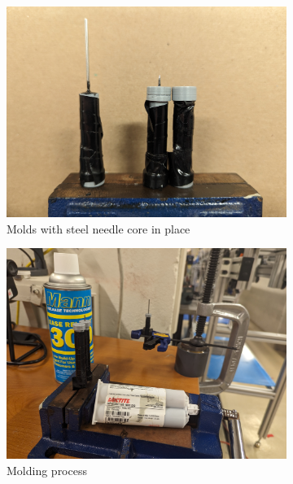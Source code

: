 \begin{figure}[!ht]
    \centering
    \begin{subfigure}[t]{0.30\textwidth}
        \centering
        \includegraphics[width=\textwidth]{assets/3 design/Molds.jpg}
        \caption{Molds with steel needle core in place}
    \end{subfigure}
    \hfill
    \begin{subfigure}[t]{0.30\textwidth}
        \centering
        \includegraphics[width=\textwidth]{assets/3 design/Mold process.jpg}
        \caption{Molding process}
    \end{subfigure}
    \hfill
    \begin{subfigure}[t]{0.30\textwidth}

\end{subfigure}
\end{figure}
